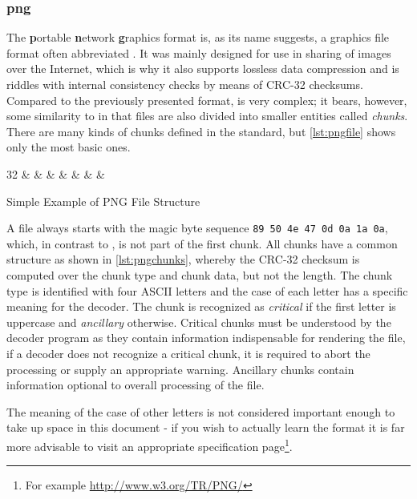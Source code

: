 \tocless\subsubsection{png}
The \textbf{p}ortable \textbf{n}etwork \textbf{g}raphics format is, as its name suggests, a graphics file
format often abbreviated \png. It was mainly designed for use in sharing of images over the Internet,
which is why it also supports lossless data compression and is riddles with internal consistency checks by
means of CRC-32 checksums. Compared to the previously presented \pcap format, \png is very complex; it bears,
however, some similarity to \pcap in that \png files are also divided into smaller entities called
\emph{chunks}. There are many kinds of chunks defined in the \png standard, but \cref{lst:pngfile} shows only
the most basic ones. 

\begin{listing}[H]
\centering
\begin{bytefield}[bitheight=\widthof{~{\tiny MAGIC}~},boxformatting={\centering}]{32}
 &
 &
 &
 &
 &
 &
 &
\end{bytefield}
\caption{Simple Example of PNG File Structure}
\label{lst:pngfile}
\end{listing}

A \png file always starts with the magic byte sequence \texttt{89 50 4e 47 0d 0a 1a 0a}, which, in contrast to
\pcap, is not part of the first chunk. All chunks have a common structure as shown in \cref{lst:pngchunks},
whereby the CRC-32 checksum is computed over the chunk type and chunk data, but not the length. The chunk type
is identified with four ASCII letters and the case of each letter has a specific meaning for the decoder.
The chunk is recognized as \emph{critical} if the first letter is uppercase and \emph{ancillary} otherwise.
Critical chunks must be understood by the decoder program as they contain information indispensable for
rendering the file, if a decoder does not recognize a critical chunk, it is required to abort the processing or
supply an appropriate warning. Ancillary chunks contain information optional to overall processing of the file.

The meaning of the case of other letters is not considered important enough to take up space in this document
- if you wish to actually learn the format it is far more advisable to visit an appropriate specification
page\footnote{For example \url{http://www.w3.org/TR/PNG/}}.

